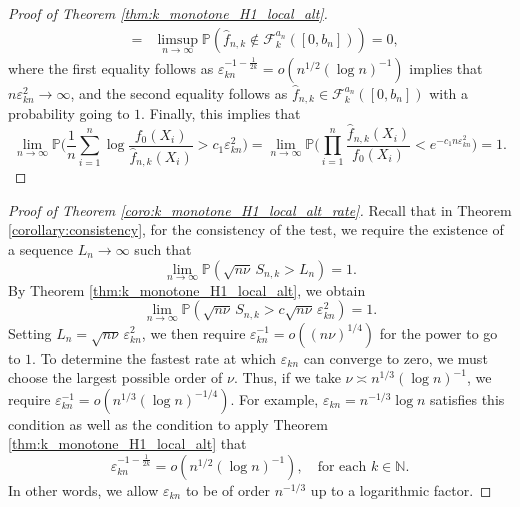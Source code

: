 \documentclass[12pt,letterpaper, twoside, openany]{article}
\theoremstyle{plain}
\begin{document}
\begin{proof}[Proof of Theorem \ref{thm:k_monotone_H1_local_alt}]
\begin{eqnarray*}
	&=& \limsup_{n\rightarrow \infty} \mathbb{P}( \hat{f}_{n,k} \notin \mathcal{F}^{a_n}_k([0,b_n]) ) = 0,
\end{eqnarray*}
where the first equality follows as $\varepsilon_{kn}^{-1 - \frac{1}{2k}} = o(n^{1/2}(\log n)^{-1})$ implies that $n \varepsilon_{kn}^2 \rightarrow \infty$, and the second equality follows as $\hat{f}_{n,k} \in \mathcal{F}^{a_n}_k([0, b_n])$ with a probability going to $1$.
Finally, this implies that 
\begin{equation*}
	\lim_{n\rightarrow \infty} \mathbb{P} \bigg( \frac{1}{n} \sum^n_{i=1} \log \frac{f_0(X_i)}{\hat{f}_{n,k}(X_i)} > c_1 \varepsilon_{kn}^2 \bigg) = 
	\lim_{n\rightarrow \infty} \mathbb{P}\bigg( \prod^n_{i=1} \frac{\hat{f}_{n,k}(X_i)}{f_0(X_i)} <  e^{-c_1 n\varepsilon_{kn}^2} \bigg)  = 1. 
\end{equation*}

\end{proof}





\begin{proof}[Proof of Theorem \ref{coro:k_monotone_H1_local_alt_rate}]
    Recall that in Theorem \ref{corollary:consistency}, for the consistency of the test, we require the existence of a sequence $L_n \to \infty$ such that
\begin{equation*}
    \lim_{n \to \infty} \mathbb{P}( \sqrt{n \nu} \, S_{n,k} > L_n ) = 1.
\end{equation*}
By Theorem \ref{thm:k_monotone_H1_local_alt}, we obtain
\begin{equation*}
    \lim_{n \to \infty} \mathbb{P}( \sqrt{n \nu} \, S_{n,k} > c \sqrt{n \nu} \, \varepsilon_{kn}^2 ) = 1.
\end{equation*}
Setting $L_n = \sqrt{n \nu} \, \varepsilon_{kn}^2$, we then require $\varepsilon_{kn}^{-1} = o((n \nu)^{1/4})$ for the power to go to $1$. To determine the fastest rate at which $\varepsilon_{kn}$ can converge to zero, we must choose the largest possible order of $\nu$. Thus, if we take $\nu \asymp n^{1/3} (\log n)^{-1}$, we require $\varepsilon_{kn}^{-1} = o(n^{1/3}(\log n)^{-1/4})$. For example, $\varepsilon_{kn} = n^{-1/3} \log n$ satisfies this condition as well as the condition to apply Theorem \ref{thm:k_monotone_H1_local_alt} that
\begin{equation*}
    \varepsilon_{kn}^{-1-\frac{1}{2k}} = o(n^{1/2} (\log n)^{-1}), \quad \text{for each } k \in \mathbb{N}.
\end{equation*}
In other words, we allow $\varepsilon_{kn}$ to be of order $n^{-1/3}$ up to a logarithmic factor. 
\end{proof}
\end{document}
